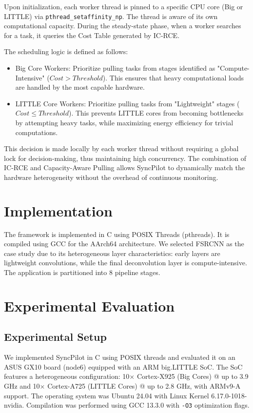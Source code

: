 \documentclass[runningheads]{llncs}
\begin{document}
Upon initialization, each worker thread is pinned to a specific CPU core (Big or LITTLE) via \texttt{pthread\_setaffinity\_np}. The thread is aware of its own computational capacity. During the steady-state phase, when a worker searches for a task, it queries the Cost Table generated by IC-RCE. 

The scheduling logic is defined as follows:
\begin{itemize}
    \item Big Core Workers: Prioritize pulling tasks from stages identified as "Compute-Intensive" ($Cost > Threshold$). This ensures that heavy computational loads are handled by the most capable hardware.
    \item LITTLE Core Workers: Prioritize pulling tasks from "Lightweight" stages ($Cost \le Threshold$). This prevents LITTLE cores from becoming bottlenecks by attempting heavy tasks, while maximizing energy efficiency for trivial computations.
\end{itemize}

This decision is made locally by each worker thread without requiring a global lock for decision-making, thus maintaining high concurrency. The combination of IC-RCE and Capacity-Aware Pulling allows SyncPilot to dynamically match the hardware heterogeneity without the overhead of continuous monitoring.

\section{Implementation}
The framework is implemented in C using POSIX Threads (pthreads). It is compiled using GCC for the AArch64 architecture. We selected FSRCNN as the case study due to its heterogeneous layer characteristics: early layers are lightweight convolutions, while the final deconvolution layer is compute-intensive. The application is partitioned into 8 pipeline stages.

\section{Experimental Evaluation}

\subsection{Experimental Setup}
We implemented SyncPilot in C using POSIX threads and evaluated it on an ASUS GX10 board (node6) equipped with an ARM big.LITTLE SoC. The SoC features a heterogeneous configuration: 10× Cortex-X925 (Big Cores) @ up to 3.9 GHz and 10× Cortex-A725 (LITTLE Cores) @ up to 2.8 GHz, with ARMv9-A support. The operating system was Ubuntu 24.04 with Linux Kernel 6.17.0-1018-nvidia. Compilation was performed using GCC 13.3.0 with \texttt{-O3} optimization flags.
\end{document}
